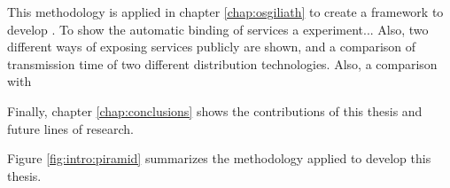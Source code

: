 This methodology is applied in chapter \ref{chap:osgiliath} to create a framework to develop . To show the automatic binding of services a experiment... Also, two different ways of exposing services publicly are shown, and a comparison of transmission time of two different distribution technologies. Also, a comparison with 

Finally, chapter \ref{chap:conclusions} shows the contributions of this thesis and future lines of research.

Figure \ref{fig:intro:piramid} summarizes the methodology applied to develop this thesis.

